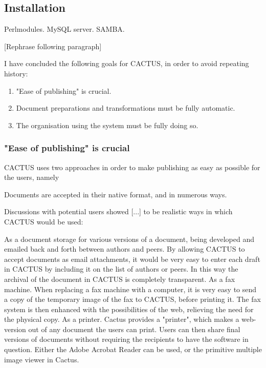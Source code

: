 \subsection{Installation}
Perlmodules.  MySQL server. SAMBA.


[Rephrase following paragraph]

I have concluded the following goals for CACTUS, in order to avoid
repeating history:

\begin{enumerate}
\item "Ease of publishing" is crucial.
  
\item Document preparations and transformations must be fully
  automatic.
  
\item The organisation using the system must be fully doing so.

\end{enumerate}

\subsubsection{"Ease of publishing" is crucial}

CACTUS uses two approaches in order to make publishing as easy as
possible for the users, namely

\begin{center}
  Documents are accepted in their native format, and in numerous ways.
\end{center}

Discussions with potential users showed [...] to be realistic ways in
which CACTUS would be used:

As a document storage for various versions of a document, being
developed and emailed back and forth between authors and peers.  By
allowing CACTUS to accept documents as email attachments, it would be
very easy to enter each draft in CACTUS by including it on the list of
authors or peers.  In this way the archival of the document in CACTUS
is completely transparent.  As a fax machine.  When replacing a fax
machine with a computer, it is very easy to send a copy of the
temporary image of the fax to CACTUS, before printing it.  The fax
system is then enhanced with the possibilities of the web, relieving
the need for the physical copy.  As a printer.  Cactus provides a
"printer", which makes a web-version out of any document the users can
print.  Users can then share final versions of documents without
requiring the recipients to have the software in question.  Either the
Adobe Acrobat Reader can be used, or the primitive multiple image
viewer in Cactus.

